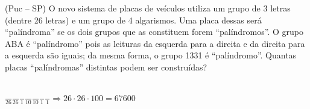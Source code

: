 \begin{ex}
(Puc – SP) O novo sistema de placas de veículos utiliza um grupo de 3 letras (dentre 26 letras) e um grupo de 4 algarismos. Uma placa dessas será “palíndroma” se os dois grupos que as constituem forem “palíndromos”. O grupo ABA é “palíndromo” pois as leituras da esquerda para a direita e da direita para a esquerda são iguais; da mesma forma, o grupo 1331 é “palíndromo”. Quantas placas “palíndromas” distintas podem ser construídas?
  \begin{sol}
    \phantom{A} \\
    $\frac{\phantom{A}}{26}\frac{\phantom{A}}{26}\frac{\phantom{A}}{1}\frac{\phantom{A}}{10}\frac{\phantom{A}}{10}\frac{\phantom{A}}{1}\frac{\phantom{A}}{1} \Longrightarrow  26\cdot26\cdot100=67600$
  \end{sol}
\end{ex}
